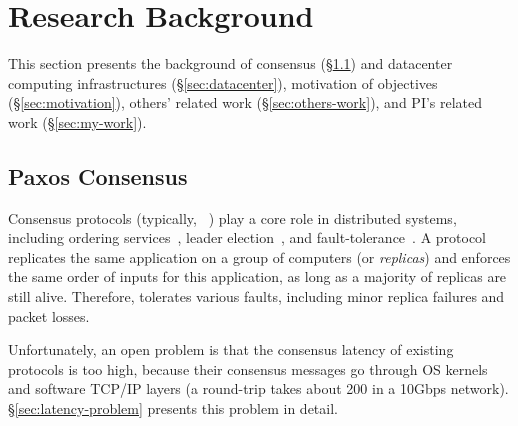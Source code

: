 \vspace{-.15in}\section{Research Background} 
\label{sec:background}\vspace{-.075in}

This section presents the background of consensus (\S\ref{sec:consensus}) and 
datacenter computing infrastructures (\S\ref{sec:datacenter}), motivation of 
objectives (\S\ref{sec:motivation}), others' related work 
(\S\ref{sec:others-work}), and PI's related work (\S\ref{sec:my-work}).

\vspace{-.15in}\subsection{Paxos Consensus} 
\label{sec:consensus}\vspace{-.075in}

Consensus protocols (typically, 
\paxos~\cite{paxos:practical,paxos,paxos:simple,paxos:complex}) play a 
core role in distributed systems, including ordering 
services~\cite{ellis:thesis,manos:hotdep10,scatter:sosp11},
leader election~\cite{zookeeper, chubby:osdi}, and
fault-tolerance~\cite{eve:osdi12,rex:eurosys14,crane:sosp15}. A \paxos protocol
replicates the same application on a group of computers (or \emph{replicas}) 
and enforces the same order of inputs for this application, as long as 
a majority of replicas are still alive. Therefore, \paxos tolerates 
various faults, including minor replica failures and packet losses.


Unfortunately, an open problem is that the consensus latency of existing 
\paxos protocols is too high, because their consensus messages go through OS 
kernels and software TCP/IP layers (a  round-trip takes about 200 \us 
in a 10Gbps network). \S\ref{sec:latency-problem} presents this problem in 
detail.

